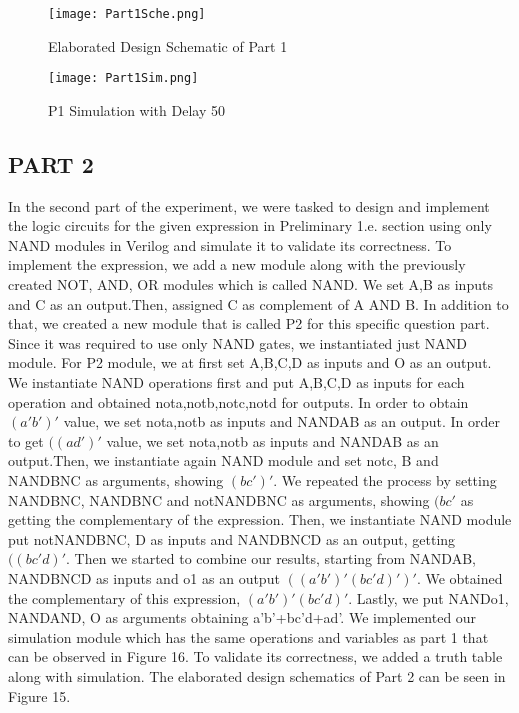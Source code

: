 \documentclass[pdftex,12pt,a4paper]{article}
\begin{document}
\begin{figure}[ht]
	\centering
	\texttt{[image: Part1Sche.png]}
	\caption{Elaborated Design Schematic of Part 1}
	\label{fig1}
\end{figure}

\begin{figure}[ht]
	\centering
	\texttt{[image: Part1Sim.png]}
	\caption{P1 Simulation with Delay 50}
	\label{fig1}
\end{figure}

\newpage
\subsection{PART 2}

In the second part of the experiment, we were tasked to design and implement the logic circuits for the given expression in Preliminary 1.e. section using only NAND modules in Verilog and simulate it to validate its correctness. To implement the expression, we add a new module along with the previously created NOT, AND, OR modules which is called NAND. We set A,B as inputs and C as an output.Then, assigned C as complement of A AND B. In addition to that, we created a new module that is called P2 for this specific question part. Since it was required to use only NAND gates, we instantiated just NAND module. For P2 module, we at first set A,B,C,D as inputs and O as an output. We instantiate NAND operations first and put A,B,C,D as inputs for each operation and obtained nota,notb,notc,notd for outputs. In order to obtain \((a'b')'\) value, we set nota,notb as inputs and NANDAB as an output. In order to get \(((ad')'\) value, we set nota,notb as inputs and NANDAB as an output.Then, we instantiate again NAND module and set notc, B and NANDBNC as arguments, showing \((bc')'\). We repeated the process by setting NANDBNC, NANDBNC and notNANDBNC as arguments, showing \((bc'\) as getting the complementary of the expression. Then, we instantiate NAND module put notNANDBNC, D as inputs and NANDBNCD as an output, getting \(((bc'd)'\). Then we started to combine our results, starting from NANDAB, NANDBNCD as inputs and o1 as an output \(((a'b')'(bc'd)')' \). We obtained the complementary of this expression, \((a'b')'(bc'd)'\). Lastly, we put NANDo1, NANDAND, O as arguments obtaining a'b'+bc'd+ad'. We implemented our simulation module which has the same operations and variables as part 1 that can be observed in Figure 16. To validate its correctness, we added a truth table along with simulation. The elaborated design schematics of Part 2 can be seen in Figure 15.
\end{document}
